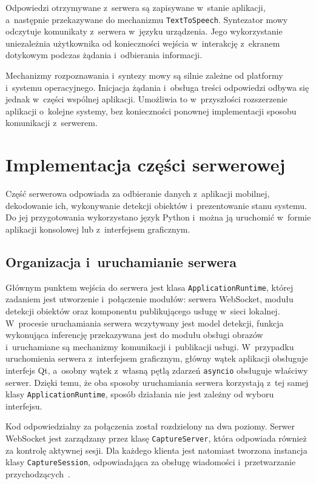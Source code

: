 Odpowiedzi otrzymywane z~serwera są zapisywane w~stanie aplikacji, a~następnie przekazywane do mechanizmu \texttt{TextToSpeech}. Syntezator mowy odczytuje komunikaty z~serwera w~języku urządzenia. Jego wykorzystanie uniezależnia użytkownika od konieczności wejścia w~interakcję z~ekranem dotykowym podczas żądania i~odbierania informacji.

Mechanizmy rozpoznawania i~syntezy mowy są silnie zależne od platformy i~systemu operacyjnego. Inicjacja żądania i~obsługa treści odpowiedzi odbywa się jednak w~części wspólnej aplikacji. Umożliwia to w~przyszłości rozszerzenie aplikacji o~kolejne systemy, bez konieczności ponownej implementacji sposobu komunikacji z~serwerem.

\section{Implementacja części serwerowej}
\label{s:implementacja_serwera}

Część serwerowa odpowiada za odbieranie danych z~aplikacji mobilnej, dekodowanie ich, wykonywanie detekcji obiektów i~prezentowanie stanu systemu. Do jej przygotowania wykorzystano język Python i~można ją uruchomić w~formie aplikacji konsolowej lub z~interfejsem graficznym.

\subsection{Organizacja i~uruchamianie serwera}

Głównym punktem wejścia do serwera jest klasa \texttt{ApplicationRuntime}, której zadaniem jest utworzenie i~połączenie modułów: serwera WebSocket, modułu detekcji obiektów oraz komponentu publikującego usługę w~sieci lokalnej. W~procesie uruchamiania serwera wczytywany jest model detekcji, funkcja wykonująca inferencję przekazywana jest do modułu obsługi obrazów i~uruchamiane są mechanizmy komunikacji i~publikacji usługi. W~przypadku uruchomienia serwera z~interfejsem graficznym, główny wątek aplikacji obsługuje interfejs Qt, a~osobny wątek z~własną pętlą zdarzeń \texttt{asyncio} obsługuje właściwy serwer. Dzięki temu, że oba sposoby uruchamiania serwera korzystają z~tej samej klasy \texttt{ApplicationRuntime}, sposób działania nie jest zależny od wyboru interfejsu.

Kod odpowiedzialny za połączenia został rozdzielony na dwa poziomy. Serwer WebSocket jest zarządzany przez klasę \texttt{CaptureServer}, która odpowiada również za kontrolę aktywnej sesji. Dla każdego klienta jest natomiast tworzona instancja klasy \texttt{CaptureSession}, odpowiadająca za obsługę wiadomości i~przetwarzanie przychodzących~.

